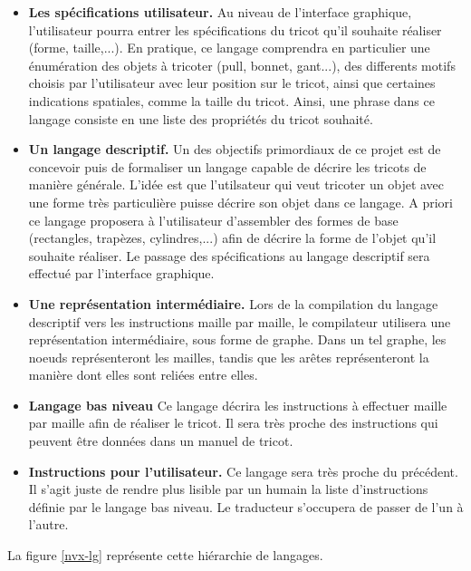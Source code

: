 \documentclass{article}
\begin{document}
\begin{itemize}
 \item \textbf{Les spécifications utilisateur.} Au niveau de l'interface graphique, l'utilisateur pourra entrer les spécifications du tricot qu'il souhaite réaliser (forme, taille,...). En pratique, ce langage comprendra en particulier une énumération des objets à tricoter (pull, bonnet, gant...), des differents motifs choisis par l'utilisateur avec leur position sur le tricot, ainsi que certaines indications spatiales, comme la taille du tricot. Ainsi, une phrase dans ce langage consiste en une liste des propriétés du tricot souhaité.
 \item \textbf{Un langage descriptif.} Un des objectifs primordiaux de ce projet est de concevoir puis de formaliser un langage capable de décrire les tricots de manière générale. L'idée est que l'utilsateur qui veut tricoter un objet avec une forme très particulière puisse décrire son objet dans ce langage. A priori ce langage proposera à l'utilisateur d'assembler des formes de base (rectangles, trapèzes, cylindres,...) afin de décrire la forme de l'objet qu'il souhaite réaliser. Le passage des spécifications au langage descriptif sera effectué par l'interface graphique.
 \item \textbf{Une représentation intermédiaire.} Lors de la compilation du langage descriptif vers les instructions maille par maille, le compilateur utilisera une représentation intermédiaire, sous forme de graphe. Dans un tel graphe, les noeuds représenteront les mailles, tandis que les arêtes représenteront la manière dont elles sont reliées entre elles.
 \item \textbf{Langage bas niveau} Ce langage décrira les instructions à effectuer maille par maille afin de réaliser le tricot. Il sera très proche des instructions qui peuvent être données dans un manuel de tricot.
 \item \textbf{Instructions pour l'utilisateur.} Ce langage sera très proche du précédent. Il s'agit juste de rendre plus lisible par un humain la liste d'instructions définie par le langage bas niveau. Le traducteur s'occupera de passer de l'un à l'autre.
\end{itemize}

La figure \ref{nvx-lg} représente cette hiérarchie de langages.
\end{document}
